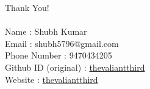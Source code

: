 \documentclass{beamer}
\begin{document}
\begin{frame}
    \begin{center}
        Thank You! \\~\\
        Name : Shubh Kumar  \\
        Email : shubh5796@gmail.com \\
        Phone Number : 9470434205 \\
        Github ID (original) : \href{https://github.com/thevaliantthird}{thevaliantthird} \\ 
        Website : \href{thevaliantthird.github.io}{thevaliantthird}
        
    \end{center}

\end{frame}
\end{document}
